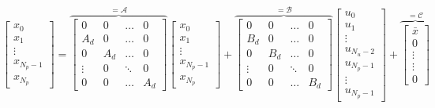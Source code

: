 \documentclass[a4paper,12pt,fleqn]{book}
\newcommand{\Np}{{N_p}}
\newcommand{\Nu}{{N_u}}
\begin{document}
\begin{equation}
\begin{bmatrix}
x_0\\
x_1\\
\vdots\\
x_{\Np-1}\\
x_{\Np}
\end{bmatrix}=
\overbrace{
\begin{bmatrix}
 0      &0      &\dots  &0\\
 A_d    &0      &\dots  & 0\\
 0      &A_d    &\dots  &0\\
 \vdots &0      &\ddots & 0\\
 0      &0      &\dots  &A_d
\end{bmatrix}
}^{=\mathcal{A}}
\begin{bmatrix}
x_0\\
x_1\\
\vdots\\
x_{\Np-1}\\
x_{\Np} 
\end{bmatrix} +
\overbrace{
\begin{bmatrix}
 0      &0      &\dots  &0\\
 B_d    &0      &\dots  & 0\\
 0      &B_d    &\dots  &0\\
 \vdots &0      &\ddots & 0\\
 0      &0      &\dots  &B_d
\end{bmatrix}
}^{=\mathcal B}
\begin{bmatrix}
u_0\\
u_1\\
\vdots\\
u_{\Nu-2}\\
u_{\Np-1}\\
\vdots\\
u_{\Np-1}
\end{bmatrix} +
\overbrace{
\begin{bmatrix}
\bar x\\
0\\
\vdots\\
\vdots \\
0 
\end{bmatrix}
}^{=\mathcal{C}}
\end{equation}
\end{document}

